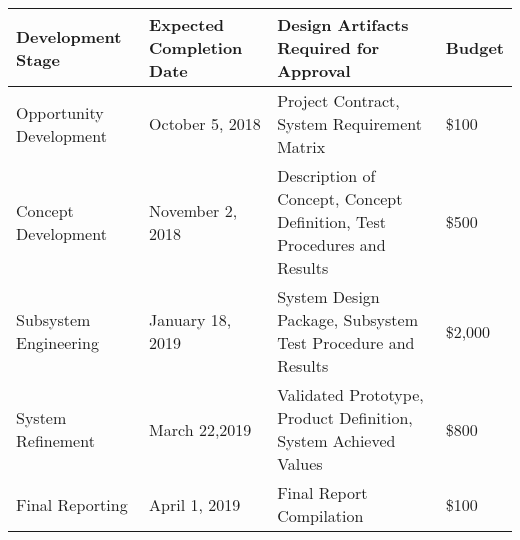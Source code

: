 

\begin{table}[h!]

\begin{tabular}{|p{4.5cm}|p{5.4cm}|p{5.4cm}|p{4.5cm}|}
 \hline	
\rowcolor[HTML]{C0C0C0}	
{\color[HTML]{000000} \textbf{Development Stage}} & {\color[HTML]{000000} \textbf{Expected Completion Date}} & {\color[HTML]{000000} \textbf{Design Artifacts Required for Approval}} & {\color[HTML]{000000} \textbf{Budget}}\\ \hline	
Opportunity Development & October 5, 2018 & Project Contract, System Requirement Matrix & \$100 \\ \hline	
Concept Development & November 2, 2018 & Description of Concept, Concept Definition, Test Procedures and Results & \$500 \\ \hline	
Subsystem Engineering & January 18, 2019 & System Design Package, Subsystem Test Procedure and Results & \$2,000\\ \hline	
System Refinement & March 22,2019 & Validated Prototype, Product Definition, System Achieved Values & \$800\\ \hline	
Final Reporting & April 1, 2019 & Final Report Compilation & \$100 \\ \hline	

  \hline  
\end{tabular}

\end{table}